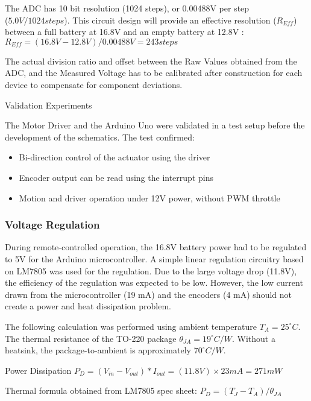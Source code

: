 The ADC has 10 bit resolution (1024 steps), or 0.00488V per step \\($5.0V / 1024 steps$). This circuit design will provide an effective resolution ($R_{Eff}$) between a full battery at 16.8V and an empty battery at 12.8V : 
\\ $R_{Eff} = (16.8V - 12.8V) / 0.00488V = 243 steps$

The actual division ratio and offset between the Raw Values obtained from the ADC, and the Measured Voltage has to be calibrated after construction for each device to compensate for component deviations. 

Validation Experiments

The Motor Driver and the Arduino Uno were validated in a test setup before the development of the schematics. The test confirmed:
\begin{itemize}
    \item Bi-direction control of the actuator using the driver
    \item Encoder output can be read using the interrupt pins
    \item Motion and driver operation under 12V power, without PWM throttle
\end{itemize}

\subsubsection{Voltage Regulation}
\label{subsubsection:exploration_1_voltage_regulation}

During remote-controlled operation, the 16.8V battery power had to be regulated to 5V for the Arduino microcontroller. A simple linear regulation circuitry based on LM7805 was used for the regulation. Due to the large voltage drop (11.8V), the efficiency of the regulation was expected to be low. However, the low current drawn from the microcontroller (19 mA) and the encoders (4 mA) should not create a power and heat dissipation problem.

The following calculation was performed using ambient temperature $T_A = 25^{\circ}C$. The thermal resistance of the TO-220 package $\theta_{JA} = 19^{\circ}C/W$. Without a heatsink, the package-to-ambient is approximately $70 ^{\circ}C/W$.

Power Dissipation $P_D = (V_{in} - V_{out}) * I_{out} = (11.8V) \times 23mA = 271mW$

Thermal formula obtained from LM7805 spec sheet:
$P_D = (T_J - T_A) / \theta_{JA}$

